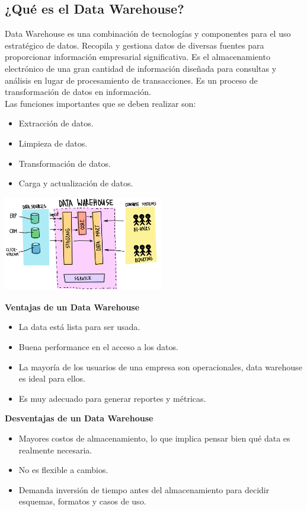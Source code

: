 \documentclass[twoside,twocolumn]{article}
\begin{document}
\subsection{¿Qué es el Data Warehouse?}
\noindent Data Warehouse es una combinación de tecnologías y componentes para el uso estratégico de datos. Recopila y gestiona datos de diversas fuentes para proporcionar información empresarial significativa. Es el almacenamiento electrónico de una gran cantidad de información diseñada para consultas y análisis en lugar de procesamiento de transacciones. Es un proceso de transformación de datos en información.\\[0.1in]
Las funciones importantes que se deben realizar son:
\begin{itemize}
    \item Extracción de datos.
    \item Limpieza de datos.
    \item Transformación de datos.
    \item Carga y actualización de datos.    
\end{itemize}
\begin{center}
    \includegraphics[width=7cm]{./img/img1.png}
\end{center}

\textbf{\large Ventajas de un Data Warehouse}
\begin{itemize}
    \item La data está lista para ser usada.
    \item Buena performance en el acceso a los datos.
    \item La mayoría de los usuarios de una empresa son operacionales, data warehouse es ideal para ellos.
    \item Es muy adecuado para generar reportes y métricas.
\end{itemize}

\textbf{\large Desventajas de un Data Warehouse}
\begin{itemize}
    \item Mayores costos de almacenamiento, lo que implica pensar bien qué data es realmente necesaria.
    \item No es flexible a cambios.
    \item Demanda inversión de tiempo antes del almacenamiento para decidir esquemas, formatos y casos de uso.
\end{itemize}
\end{document}
